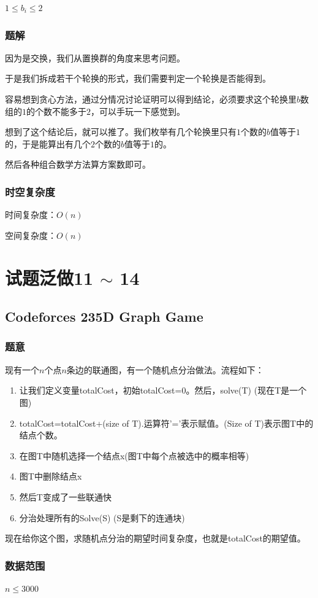 \documentclass{ctexart}
\begin{document}
$1 \le b_i \le 2$
\subsubsection{题解}
因为是交换，我们从置换群的角度来思考问题。

于是我们拆成若干个轮换的形式，我们需要判定一个轮换是否能得到。

容易想到贪心方法，通过分情况讨论证明可以得到结论，必须要求这个轮换里$b$数组的$1$的个数不能多于$2$，可以手玩一下感觉到。

想到了这个结论后，就可以推了。我们枚举有几个轮换里只有$1$个数的$b$值等于$1$的，于是能算出有几个$2$个数的$b$值等于$1$的。

然后各种组合数学方法算方案数即可。
\subsubsection{时空复杂度}
时间复杂度：$O(n)$

空间复杂度：$O(n)$
\newpage
\section{试题泛做11 $\sim$ 14}
\subsection{Codeforces 235D Graph Game}
\subsubsection{题意}
现有一个$n$个点$n$条边的联通图，有一个随机点分治做法。流程如下：

\begin{enumerate}
\item 让我们定义变量totalCost，初始totalCost=0。然后，solve(T) (现在T是一个图)
\item totalCost=totalCost+(size of T).运算符’=’表示赋值。(Size of T)表示图T中的结点个数。
\item 在图T中随机选择一个结点x(图T中每个点被选中的概率相等)
\item 图T中删除结点x
\item 然后T变成了一些联通快
\item 分治处理所有的Solve(S) (S是剩下的连通块)
\end{enumerate}

现在给你这个图，求随机点分治的期望时间复杂度，也就是totalCost的期望值。
\subsubsection{数据范围}
$n \le 3000$
\end{document}
